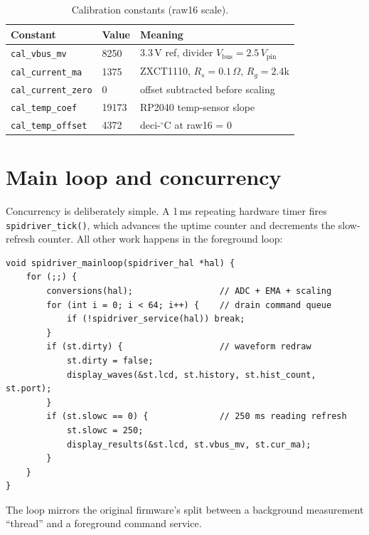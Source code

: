 \documentclass[11pt,a4paper]{article}
\begin{document}
\begin{table}[h!]
\centering
\begin{tabular}{@{}lll@{}}
\toprule
\textbf{Constant} & \textbf{Value} & \textbf{Meaning}\\
\midrule
\texttt{cal\_vbus\_mv}    & 8250  & 3.3\,V ref, divider $V_\text{bus}=2.5\,V_\text{pin}$\\
\texttt{cal\_current\_ma} & 1375  & ZXCT1110, $R_s{=}0.1\,\Omega$, $R_g{=}2.4$k\\
\texttt{cal\_current\_zero} & 0    & offset subtracted before scaling\\
\texttt{cal\_temp\_coef}  & 19173 & RP2040 temp-sensor slope\\
\texttt{cal\_temp\_offset}& 4372  & deci-$^\circ$C at raw16 = 0\\
\bottomrule
\end{tabular}
\caption{Calibration constants (raw16 scale).}
\label{tab:cal}
\end{table}

\section{Main loop and concurrency}

Concurrency is deliberately simple. A 1\,ms repeating hardware timer fires
\texttt{spidriver\_tick()}, which advances the uptime counter and decrements
the slow-refresh counter. All other work happens in the foreground loop:

\begin{lstlisting}[style=c]
void spidriver_mainloop(spidriver_hal *hal) {
    for (;;) {
        conversions(hal);                 // ADC + EMA + scaling
        for (int i = 0; i < 64; i++) {    // drain command queue
            if (!spidriver_service(hal)) break;
        }
        if (st.dirty) {                   // waveform redraw
            st.dirty = false;
            display_waves(&st.lcd, st.history, st.hist_count, st.port);
        }
        if (st.slowc == 0) {              // 250 ms reading refresh
            st.slowc = 250;
            display_results(&st.lcd, st.vbus_mv, st.cur_ma);
        }
    }
}
\end{lstlisting}

The loop mirrors the original firmware's split between a background
measurement ``thread'' and a foreground command service.
\end{document}
